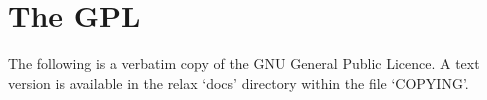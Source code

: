 

\section{The GPL}

The following is a verbatim copy of the GNU General Public Licence.
A text version is available in the relax `docs' directory within the file `COPYING'.


\newpage


